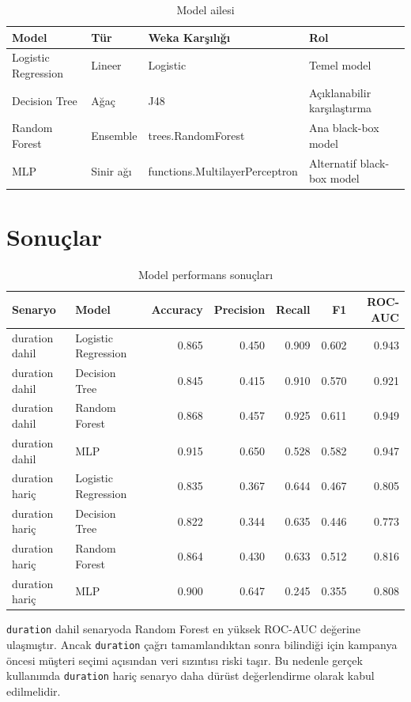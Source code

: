 \documentclass[11pt,a4paper]{article}
\begin{document}
\begin{table}[h]
\centering
\begin{tabular}{llll}
\toprule
Model & Tür & Weka Karşılığı & Rol\\
\midrule
Logistic Regression & Lineer & Logistic & Temel model\\
Decision Tree & Ağaç & J48 & Açıklanabilir karşılaştırma\\
Random Forest & Ensemble & trees.RandomForest & Ana black-box model\\
MLP & Sinir ağı & functions.MultilayerPerceptron & Alternatif black-box model\\
\bottomrule
\end{tabular}
\caption{Model ailesi}
\end{table}

\section{Sonuçlar}
\begin{table}[h]
\centering
\small
\begin{tabular}{llrrrrr}
\toprule
Senaryo & Model & Accuracy & Precision & Recall & F1 & ROC-AUC\\
\midrule
duration dahil & Logistic Regression & 0.865 & 0.450 & 0.909 & 0.602 & 0.943\\
duration dahil & Decision Tree & 0.845 & 0.415 & 0.910 & 0.570 & 0.921\\
duration dahil & Random Forest & 0.868 & 0.457 & 0.925 & 0.611 & 0.949\\
duration dahil & MLP & 0.915 & 0.650 & 0.528 & 0.582 & 0.947\\
duration hariç & Logistic Regression & 0.835 & 0.367 & 0.644 & 0.467 & 0.805\\
duration hariç & Decision Tree & 0.822 & 0.344 & 0.635 & 0.446 & 0.773\\
duration hariç & Random Forest & 0.864 & 0.430 & 0.633 & 0.512 & 0.816\\
duration hariç & MLP & 0.900 & 0.647 & 0.245 & 0.355 & 0.808\\
\bottomrule
\end{tabular}
\caption{Model performans sonuçları}
\end{table}

\texttt{duration} dahil senaryoda Random Forest en yüksek ROC-AUC değerine ulaşmıştır. Ancak \texttt{duration} çağrı tamamlandıktan sonra bilindiği için kampanya öncesi müşteri seçimi açısından veri sızıntısı riski taşır. Bu nedenle gerçek kullanımda \texttt{duration} hariç senaryo daha dürüst değerlendirme olarak kabul edilmelidir.
\end{document}
